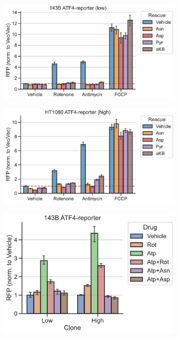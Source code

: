 \begin{figure}
     \centering
     \begin{subfigure}[b]{0.49\textwidth}
         \includegraphics[width=\textwidth]{figures/chap2/143B_ETCinhib_ATF4rep_low.pdf}
         \caption{}
         \label{fig:ch2:143B_ETCinhib_ATF4rep_low}
     \end{subfigure}
     \hfill
     \begin{subfigure}[b]{0.49\textwidth}
         \includegraphics[width=\textwidth]{figures/chap2/HT1080_ETCinhib_ATF4rep_high.pdf}
         \caption{}
         \label{fig:ch2:HT1080_ETCinhib_ATF4rep_high}
     \end{subfigure}
     \hfill
     \begin{subfigure}[b]{0.4\textwidth}
         \includegraphics[width=\textwidth]{figures/chap2/143B_Atp_ATF4rep.pdf}

\end{subfigure}
\end{figure}
